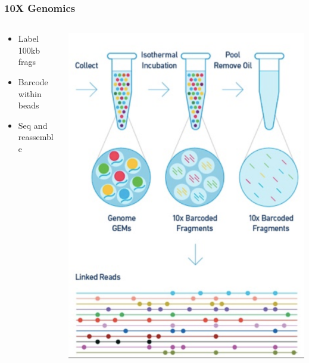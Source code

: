 \documentclass[14pt,handout]{beamer}
\begin{document}
%

\begin{frame}
\frametitle{10X Genomics}
\begin{columns}
	\begin{column}{0.4\textwidth}
		\begin{itemize}
			\item<+-> Label 100kb frags
			\item<+-> Barcode within beads
			\item<+-> Seq and reassemble
		\end{itemize}
		\end{column}
	\begin{column}{0.6\textwidth}
		\begin{center}
     		\includegraphics[width=1\textwidth]{images_20171024_10X.png}
     	\end{center}
	\end{column}
\end{columns}
\end{frame}
\end{document}
